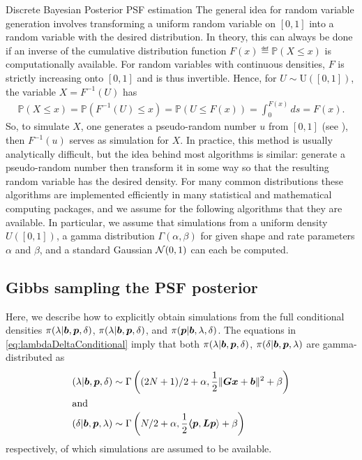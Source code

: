\begin{chapter}{Discrete Bayesian Posterior PSF estimation}
The general idea for random variable generation involves transforming a uniform random variable on $[0,1]$ into a random variable with the desired distribution.
In theory, this can always be done if an inverse of the cumulative distribution function $F(x) \eqdef \mathbb P(X \le x)$ is computationally available.
For random variables with continuous densities, $F$ is strictly increasing onto $[0,1]$ and is thus invertible.  
Hence, for $U\sim \mathrm{U([0,1])}$, the variable $X = F^{-1}(U)$ has 
\begin{align}
  \mathbb P( X \le x) = \mathbb P( F^{-1}(U)\le  x ) = \mathbb P( U \le F(x) ) = \int_0^{F(x)}ds = F(x).
\end{align}
So, to simulate $X$, one generates a pseudo-random number $u$ from $[0,1]$ (see \citep{knuthart1981}), then $F^{-1}(u)$ serves as simulation for $X$.
In practice, this method is usually analytically difficult, but the idea behind most algorithms is similar: generate a pseudo-random number then transform it in some way so that the resulting random variable has the desired density.
For many common distributions these algorithms are implemented efficiently in many statistical and mathematical computing packages, and we assume for the following algorithms that they are available.
In particular, we assume that simulations from a uniform density $U([0,1])$, a gamma distribution $\Gamma(\alpha,\beta)$ for given shape and rate parameters $\alpha$ and $\beta$, and a standard Gaussian $\mathcal{N}(0,1)$ can each be computed.

\subsection{Gibbs sampling the PSF posterior} \label{subsec:gibbs}

Here, we describe how to explicitly obtain simulations from the full conditional densities $\pi(\lambda|\mbox{\boldmath$b$},\mbox{\boldmath$p$},\delta)$, $\pi(\lambda|\mbox{\boldmath$b$},\mbox{\boldmath$p$},\delta)$, and $\pi(\mbox{\boldmath$p$}|\mbox{\boldmath$b$},\lambda,\delta)$.
The equations in \eqref{eq:lambdaDeltaConditional} imply that both $\pi(\lambda|\mbox{\boldmath$b$},\mbox{\boldmath$p$},\delta)$, $\pi(\delta|\mbox{\boldmath$b$},\mbox{\boldmath$p$},\lambda)$ are gamma-distributed as
\begin{align}
  (\lambda|\mbox{\boldmath$b$},\mbox{\boldmath$p$},\delta) &\sim \Gamma\left((2N+1)/2+\alpha,\frac{1}{2}\|\mbox{\boldmath$Gx$} + \mbox{\boldmath$b$}\|^2 + \beta\right)\\
  \intertext{and}
  (\delta|\mbox{\boldmath$b$},\mbox{\boldmath$p$},\lambda) &\sim \Gamma\left(N/2+\alpha,\frac{1}{2}\mbox{\boldmath$\langle$} \mbox{\boldmath$p$},\mbox{\boldmath$L$}\mbox{\boldmath$p$} \rangle+ \beta\right)
\end{align}
respectively, of which simulations are assumed to be available.


\end{chapter}
